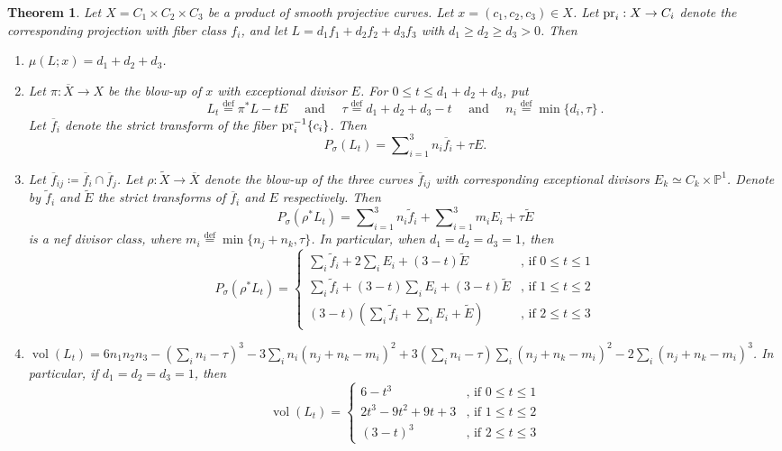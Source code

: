 \documentclass[12pt]{amsart}
\newtheorem{theorem}[lemma]{Theorem}
\theoremstyle{definition}
\newcommand{\bb}{\ensuremath{\mathfrak{b}}}
\renewcommand{\geq}{\geqslant}
\renewcommand{\leq}{\leqslant}
\DeclareMathOperator{\vol}{vol}
\newcommand{\deq}{\ensuremath{\stackrel{\textrm{def}}{=}}}
\newcommand{\?}{ \circled{{\large\bf ?}}}
\let\bb\mathbb
\begin{document}


\begin{theorem}\label{thm:CCCfinalform}
	Let $X=C_1\times C_2\times C_3$ be a product of smooth projective curves. Let $x=(c_1,c_2,c_3)\in X$. Let ${\rm pr}_i:X\to C_i$ denote the corresponding projection with fiber class $f_i$, and let $L=d_1f_1+d_2f_2+d_3f_3$ with $d_1\geq d_2\geq d_3>0$. Then
	\begin{enumerate}
		\item $\mu(L;x)=d_1+d_2+d_3$.
		\smallskip
		
		\item Let $\pi:\overline X\to X$ be the blow-up of $x$ with exceptional divisor $E$. 
		For $0\leq t\leq d_1+d_2+d_3$, put 
		\[L_t\deq\pi^*L-tE\quad\text{ and }\quad\tau\deq d_1+d_2+d_3-t\quad\text{ and }\quad n_i\deq\min\{d_i,\tau\}\ .\] Let $\overline f_i$ denote the strict transform of the fiber ${\rm pr}_i^{-1}\{c_i\}$. Then  
		\[P_\sigma(L_t)=\sum\nolimits_{i=1}^3n_i\overline f_i+\tau E.\]
		
		\item Let $\overline f_{ij}\coloneqq\overline f_i\cap\overline f_j$.  Let $\rho:\widetilde X\to\overline X$ denote the blow-up of the three curves $\overline f_{ij}$ with corresponding exceptional divisors $E_k\simeq C_k\times\bb P^1$.  Denote by $\widetilde f_i$ and $\widetilde E$ the strict transforms of $\overline f_i$ and $E$ respectively. 
		Then 
		\[P_{\sigma}(\rho^*L_t)=\sum\nolimits_{i=1}^3n_i\widetilde f_i+\sum\nolimits_{i=1}^3m_iE_i+\tau\widetilde E\]
		is a nef divisor class, where $m_i\deq \min\{n_j+n_k,\tau\}$. 		 In particular, when $d_1=d_2=d_3=1$, then
		 \[P_{\sigma}(\rho^*L_t)=\begin{cases}
		 	\sum_i\widetilde f_i+2\sum_iE_i+(3-t)\widetilde E&\text{, if }0\leq t\leq 1\\
		 	\sum_i\widetilde f_i+(3-t)\sum_iE_i+(3-t)\widetilde E&\text{, if }1\leq t\leq 2\\
		 	(3-t)(\sum_i\widetilde f_i+\sum_iE_i+\widetilde E)&\text{, if }2\leq t\leq 3
		 \end{cases}\]
	 \smallskip
	 
		\item $\vol(L_t)=6n_1n_2n_3-(\sum_in_i-\tau)^3-3\sum_in_i(n_j+n_k-m_i)^2+3(\sum_in_i-\tau)\sum_i(n_j+n_k-m_i)^2-2\sum_i(n_j+n_k-m_i)^3$. In particular, if $d_1=d_2=d_3=1$, then
		\[\vol(L_t)=\begin{cases}6-t^3&\text{, if }0\leq t\leq 1\\
			2t^3-9t^2+9t+3&\text{, if }1\leq t\leq 2\\
			(3-t)^3&\text{, if }2\leq t\leq 3
			\end{cases}
			\]
			\smallskip
			

\end{enumerate}
\end{theorem}
\end{document}
